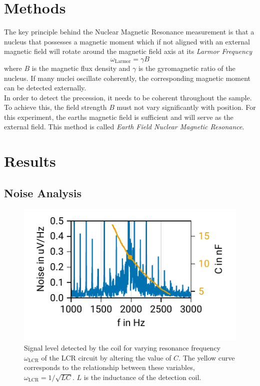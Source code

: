 \documentclass[
    parskip=half, 
    twoside=false,
    twocolumn=true,
    fontsize=11pt,
]{scrarticle}
\begin{document}
\section{Methods}
The key principle behind the Nuclear Magnetic Resonance measurement is that a nucleus that possesses a magnetic moment which if not aligned with an external magnetic field will rotate around the magnetic field axis at its \textit{Larmor Frequency}
\begin{equation}
\label{eq:larmor_frequency}
 \omega_\text{Larmor} = \gamma B
\end{equation}
where $B$ is the magnetic flux density and $\gamma$ is the gyromagnetic ratio of the nucleus. If many nuclei oscillate coherently, the corresponding magnetic moment can be detected externally.\\
In order to detect the precession, it needs to be coherent throughout the sample.
To achieve this, the field strength $B$ must not vary significantly with position. For this experiment, the earths magnetic field is sufficient and will serve as the external field. This method is called \textit{Earth Field Nuclear Magnetic Resonance}.

\section{Results}
\subsection{Noise Analysis}
\begin{figure}
    \centering
    \includegraphics{figures/01 noise.pdf}
    \caption{Signal level detected by the coil for varying resonance frequency $\omega_{\text{LCR}}$ of the LCR circuit by altering the value of $C$. The yellow curve corresponds to the relationship between these variables, $\omega_{\text{LCR}} = 1/\sqrt{LC}$. $L$ is the inductance of the detection coil.}
    \label{fig:tune_C}
\end{figure}
\end{document}
